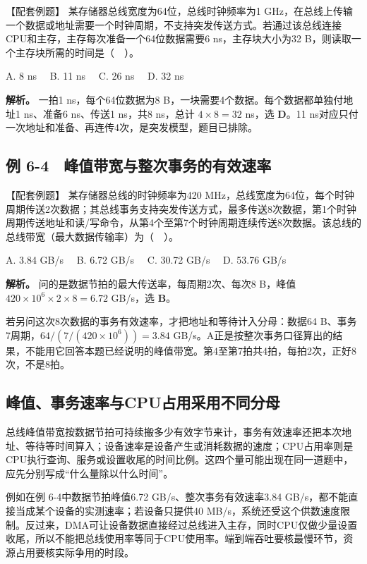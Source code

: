 【配套例题】 某存储器总线宽度为64位，总线时钟频率为1 GHz，在总线上传输一个数据或地址需要一个时钟周期，不支持突发传送方式。若通过该总线连接CPU和主存，主存每次准备一个64位数据需要6 ns，主存块大小为32 B，则读取一个主存块所需的时间是（　）。

A. 8 ns　 B. 11 ns　 C. 26 ns　 D. 32 ns

\textbf{解析。} 一拍1 ns，每个64位数据为8 B，一块需要4个数据。每个数据都单独付地址1 ns、准备6 ns、传送1 ns，共8 ns，总计 \(4\times8=32\) ns，选 \textbf{D}。11 ns对应只付一次地址和准备、再连传4次，是突发模型，题目已排除。

\subsection{例 6-4　峰值带宽与整次事务的有效速率}\label{CO06-example-4}

【配套例题】 某存储器总线的时钟频率为420 MHz，总线宽度为64位，每个时钟周期传送2次数据；其总线事务支持突发传送方式，最多传送8次数据，第1个时钟周期传送地址和读/写命令，从第4个至第7个时钟周期连续传送8次数据。该总线的总线带宽（最大数据传输率）为（　）。

A. 3.84 GB/s　 B. 6.72 GB/s　 C. 30.72 GB/s　 D. 53.76 GB/s

\textbf{解析。} 问的是数据节拍的最大传送率，每周期2次、每次8 B，峰值 \(420\times10^6\times2\times8=6.72\) GB/s，选 \textbf{B}。

若另问这次8次数据的事务有效速率，才把地址和等待计入分母：数据64 B、事务7周期，\(64/(7/(420\times10^6))=3.84\) GB/s。A正是按整次事务口径算出的结果，不能用它回答本题已经说明的峰值带宽。第4至第7拍共4拍，每拍2次，正好8次，不是8拍。

\subsection{峰值、事务速率与CPU占用采用不同分母}\label{ux5cf0ux503cux4e8bux52a1ux901fux7387ux4e0ecpuux5360ux7528ux91c7ux7528ux4e0dux540cux5206ux6bcd}

总线峰值带宽按数据节拍可持续搬多少有效字节来计，事务有效速率还把本次地址、等待等时间算入；设备速率是设备产生或消耗数据的速度；CPU占用率则是CPU执行查询、服务或设置收尾的时间比例。这四个量可能出现在同一道题中，应先分别写成``什么量除以什么时间''。

例如在例 6-4中数据节拍峰值6.72 GB/s、整次事务有效速率3.84 GB/s，都不能直接当成某个设备的实测速率；若设备只提供40 MB/s，系统还受这个供数速度限制。反过来，DMA可让设备数据直接经过总线进入主存，同时CPU仅做少量设置收尾，所以不能把总线使用率等同于CPU使用率。端到端吞吐要核最慢环节，资源占用要核实际争用的时段。

